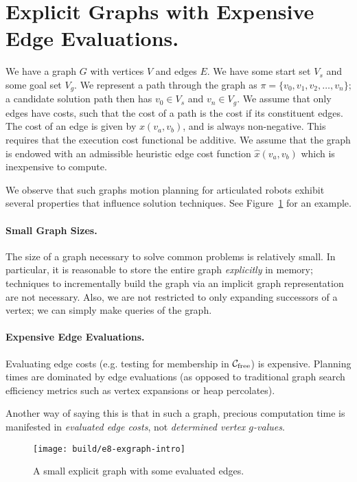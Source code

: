 \section{Explicit Graphs with Expensive Edge Evaluations.}

We have a graph $G$ with vertices $V$ and edges $E$.
We have some start set $V_s$ and some goal set $V_g$.
We represent a path through the graph as
$\pi = \{ v_0, v_1, v_2, \dots, v_n \}$;
a candidate solution path then has $v_0 \in V_s$ and $v_n \in V_g$.
We assume that only edges have costs,
such that the cost of a path is the cost if its constituent edges.
The cost of an edge is given by $x(v_a,v_b)$, and is always non-negative.
This requires that the execution cost functional be additive.
We assume that the graph is endowed with an admissible heuristic edge cost
function
$\hat{x}(v_a,v_b)$
which is inexpensive to compute.

We observe that such graphs motion planning for articulated robots
exhibit several properties that influence solution techniques.
See Figure~\ref{fig:seg-intro} for an example.

\paragraph{Small Graph Sizes.}
The size of a graph necessary to solve common problems
is relatively small.
In particular, it is reasonable to store the entire graph
\emph{explicitly} in memory;
techniques to incrementally build the graph
via an implicit graph representation
are not necessary.
Also,
we are not restricted to only expanding successors of a vertex;
we can simply make queries of the graph.

\paragraph{Expensive Edge Evaluations.}
Evaluating edge costs (e.g. testing for membership in
$\mathcal{C}_{\mbox{\scriptsize free}}$)
is expensive.
Planning times are dominated by edge evaluations
(as opposed to traditional graph search efficiency metrics
such as vertex expansions or heap percolates).

Another way of saying this is that in such a graph,
precious computation time is manifested in
\emph{evaluated edge costs},
not \emph{determined vertex $g$-values}.


\begin{figure}
   \centering
   \texttt{[image: build/e8-exgraph-intro]}
   \caption{A small explicit graph with some evaluated edges.}
   \label{fig:seg-intro}
\end{figure}

